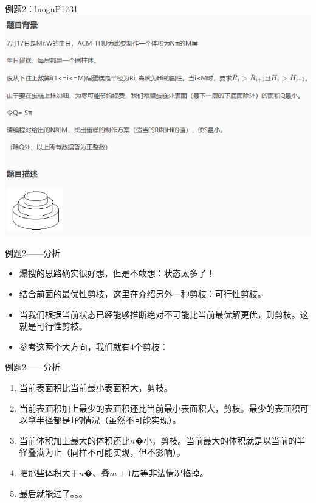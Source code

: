 \documentclass{bemaer}[UTF-8]
\begin{document}
\begin{frame}{例题2：luoguP1731}
\includegraphics{luoguP1731.png}
\end{frame}

\begin{frame}{例题2——分析}
\begin{itemize}
  \item 爆搜的思路确实很好想，但是不敢想：状态太多了！
  \item 结合前面的最优性剪枝，这里在介绍另外一种剪枝：可行性剪枝。
  \item 当我们根据当前状态已经能够推断绝对不可能比当前最优解更优，则剪枝。这就是可行性剪枝。
  \item 参考这两个大方向，我们就有4个剪枝：
\end{itemize}
\end{frame}

\begin{frame}{例题2——分析}
\begin{enumerate}
  \item 当前表面积比当前最小表面积大，剪枝。
  \item 当前表面积加上最少的表面积还比当前最小表面积大，剪枝。最少的表面积可以拿半径都是1的情况（虽然不可能实现）。
  \item 当前体积加上最大的体积还比$n$�小，剪枝。当前最大的体积就是以当前的半径叠满为止（同样不可能实现，但不影响）。
  \item 把那些体积大于$n$�、叠$m+1$层等非法情况掐掉。
  \item 最后就能过了。。。
\end{enumerate}
\end{frame}
\end{document}

